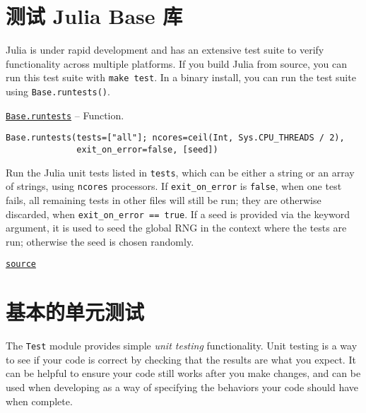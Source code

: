 \hypertarget{10440826130497106701}{}


\section{测试 Julia Base 库}



Julia is under rapid development and has an extensive test suite to verify functionality across multiple platforms. If you build Julia from source, you can run this test suite with \texttt{make test}. In a binary install, you can run the test suite using \texttt{Base.runtests()}.


\hypertarget{2272377293323848310}{} 
\hyperlink{2272377293323848310}{\texttt{Base.runtests}}  -- {Function.}

\begin{adjustwidth}{2em}{0pt}


\begin{verbatim}
Base.runtests(tests=["all"]; ncores=ceil(Int, Sys.CPU_THREADS / 2),
              exit_on_error=false, [seed])
\end{verbatim}

Run the Julia unit tests listed in \texttt{tests}, which can be either a string or an array of strings, using \texttt{ncores} processors. If \texttt{exit\_on\_error} is \texttt{false}, when one test fails, all remaining tests in other files will still be run; they are otherwise discarded, when \texttt{exit\_on\_error == true}. If a seed is provided via the keyword argument, it is used to seed the global RNG in the context where the tests are run; otherwise the seed is chosen randomly.



\href{https://github.com/JuliaLang/julia/blob/44fa15b1502a45eac76c9017af94332d4557b251/base/util.jl#L811-L821}{\texttt{source}}


\end{adjustwidth}

\hypertarget{7988833292242463234}{}


\section{基本的单元测试}



The \texttt{Test} module provides simple \emph{unit testing} functionality. Unit testing is a way to see if your code is correct by checking that the results are what you expect. It can be helpful to ensure your code still works after you make changes, and can be used when developing as a way of specifying the behaviors your code should have when complete.



